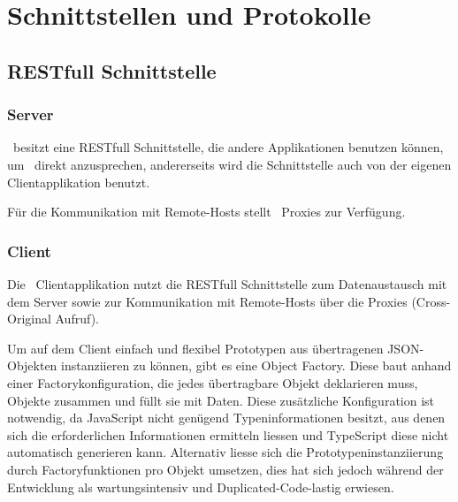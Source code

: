 \chapter{Schnittstellen und Protokolle}
	
\section{RESTfull Schnittstelle}

	\subsection{Server}
		\eeppi\ besitzt eine RESTfull Schnittstelle, die andere Applikationen benutzen können, um \eeppi\ direkt anzusprechen, andererseits wird die Schnittstelle auch von der eigenen Clientapplikation benutzt.
		
		Für die Kommunikation mit Remote-Hosts stellt \eeppi\ Proxies zur Verfügung.
	
	
	\subsection{Client}
		Die \eeppi\ Clientapplikation nutzt die RESTfull Schnittstelle zum Datenaustausch mit dem Server sowie zur Kommunikation mit Remote-Hosts über die Proxies (Cross-Original Aufruf).
		
		Um auf dem Client einfach und flexibel Prototypen aus übertragenen JSON-Objekten instanziieren zu können, gibt es eine Object Factory.
		Diese baut anhand einer Factorykonfiguration, die jedes übertragbare Objekt deklarieren muss, Objekte zusammen und füllt sie mit Daten.
		Diese zusätzliche Konfiguration ist notwendig, da JavaScript nicht genügend Typeninformationen besitzt, aus denen sich die erforderlichen Informationen ermitteln liessen und TypeScript diese nicht automatisch generieren kann.
		Alternativ liesse sich die Prototypeninstanziierung  durch Factoryfunktionen pro Objekt umsetzen, dies hat sich jedoch während der Entwicklung als wartungsintensiv und Duplicated-Code-lastig erwiesen.